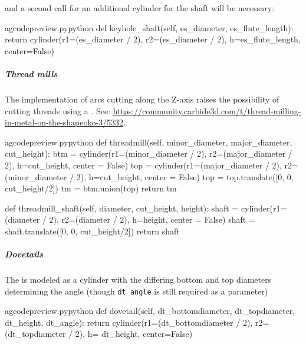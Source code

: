 \documentclass{ltxdoc}
\begin{document}
\noindent and a second call for an additional cylinder for the shaft will be necessary:

\lstset{firstnumber=\thegcpy}
\begin{writecode}{a}{gcodepreview.py}{python}
    def keyhole_shaft(self, es_diameter, es_flute_length):
        return cylinder(r1=(es_diameter / 2), r2=(es_diameter / 2), h=es_flute_length, center=False)

\end{writecode}
\addtocounter{gcpy}{3}


\subparagraph{Thread mills}

\label{subpara:threadmills}The implementation of arcs cutting along the Z-axis raises the 
possibility of cutting threads using a . 
See: \url{https://community.carbide3d.com/t/thread-milling-in-metal-on-the-shapeoko-3/5332}.

\lstset{firstnumber=\thegcpy}
\begin{writecode}{a}{gcodepreview.py}{python}
    def threadmill(self, minor_diameter, major_diameter, cut_height):
        btm = cylinder(r1=(minor_diameter / 2), r2=(major_diameter / 2), h=cut_height, center = False)
        top = cylinder(r1=(major_diameter / 2), r2=(minor_diameter / 2), h=cut_height, center = False)
        top = top.translate([0, 0, cut_height/2])
        tm = btm.union(top)
        return tm

    def threadmill_shaft(self, diameter, cut_height, height):
        shaft = cylinder(r1=(diameter / 2), r2=(diameter / 2), h=height, center = False)
        shaft = shaft.translate([0, 0, cut_height/2])
        return shaft

\end{writecode}
\addtocounter{gcpy}{12}

\subparagraph{Dovetails}

\label{subpara:dovetails}The  is modeled as a cylinder with the differing bottom and top diameters determining the angle (though \verb|dt_angle| is still required as a parameter)

\lstset{firstnumber=\thegcpy}
\begin{writecode}{a}{gcodepreview.py}{python}
    def dovetail(self, dt_bottomdiameter, dt_topdiameter, dt_height, dt_angle):
        return cylinder(r1=(dt_bottomdiameter / 2), r2=(dt_topdiameter / 2), h= dt_height, center=False)

\end{writecode}
\addtocounter{gcpy}{3}
\end{document}
